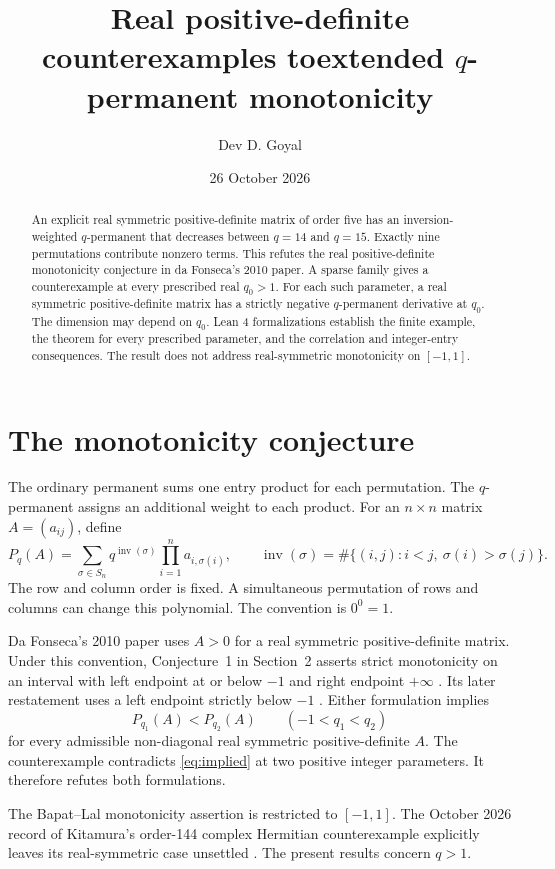 \documentclass[11pt]{article}
\title{Real positive-definite counterexamples to\newline extended $q$-permanent monotonicity}
\author{Dev D. Goyal}
\date{26 October 2026}
\newcommand{\inv}{\operatorname{inv}}
\begin{document}
\maketitle
\begin{abstract}
An explicit real symmetric positive-definite matrix of order five has an inversion-weighted $q$-permanent that decreases between $q=14$ and $q=15$. Exactly nine permutations contribute nonzero terms. This refutes the real positive-definite monotonicity conjecture in da Fonseca's 2010 paper. A sparse family gives a counterexample at every prescribed real $q_0>1$. For each such parameter, a real symmetric positive-definite matrix has a strictly negative $q$-permanent derivative at $q_0$. The dimension may depend on $q_0$. Lean 4 formalizations establish the finite example, the theorem for every prescribed parameter, and the correlation and integer-entry consequences. The result does not address real-symmetric monotonicity on $[-1,1]$.
\end{abstract}

\section{The monotonicity conjecture}
The ordinary permanent sums one entry product for each permutation. The $q$-permanent assigns an additional weight to each product. For an $n\times n$ matrix $A=(a_{ij})$, define
\[
 P_q(A)=\sum_{\sigma\in S_n}q^{\inv(\sigma)}\prod_{i=1}^n a_{i,\sigma(i)},\qquad
 \inv(\sigma)=\#\{(i,j):i<j,\ \sigma(i)>\sigma(j)\}.
\]
The row and column order is fixed. A simultaneous permutation of rows and columns can change this polynomial. The convention is $0^0=1$.

Da Fonseca's 2010 paper uses $A>0$ for a real symmetric positive-definite matrix. Under this convention, Conjecture~1 in Section~2 asserts strict monotonicity on an interval with left endpoint at or below $-1$ and right endpoint $+\infty$ \cite{fonseca2010}. Its later restatement uses a left endpoint strictly below $-1$ \cite[Conjecture~2]{fonseca2018}. Either formulation implies
\begin{equation}\label{eq:implied}
 P_{q_1}(A)<P_{q_2}(A)\qquad(-1<q_1<q_2)
\end{equation}
for every admissible non-diagonal real symmetric positive-definite $A$. The counterexample contradicts \eqref{eq:implied} at two positive integer parameters. It therefore refutes both formulations.

The Bapat--Lal monotonicity assertion is restricted to $[-1,1]$. The October 2026 record of Kitamura's order-144 complex Hermitian counterexample explicitly leaves its real-symmetric case unsettled \cite{kitamura}. The present results concern $q>1$.
\end{document}
